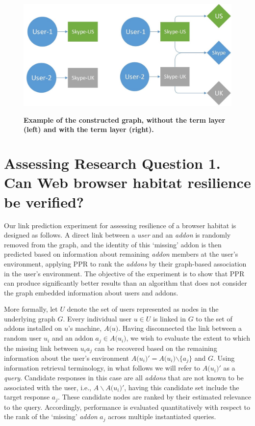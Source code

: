 \documentclass[10pt,letterpaper]{article}
\begin{document}
\begin{figure}[!h]
\caption{{\bf Example of the constructed graph, without the term layer (left) and with the term layer (right).}}
\includegraphics[width=\linewidth]{figures/skype.jpg}
\label{fig:skype}
\end{figure}

\section*{Assessing Research Question 1. Can Web browser habitat resilience be verified?}

Our link prediction experiment for assessing resilience of a browser habitat is designed as follows. A direct link between a \textit{user} and an\textit{ addon} is randomly removed from the graph, and the identity of this `missing' addon is then predicted based on information about remaining \textit{addon} members at the user's environment, applying PPR to rank the \textit{addons} by their graph-based association in the user's environment. The objective of the experiment is to show that PPR can produce significantly better results than an algorithm that does not consider the graph embedded information about users and addons. 

More formally, let $U$ denote the set of users represented as nodes in the underlying graph $G$. Every individual user $u\mathrm{\in }U$ is linked in $G$ to the set of addons installed on $u$'s machine, $A\mathrm{(}u\mathrm{)}$. Having disconnected the link between a random user $u_i$ and an addon $a_j\mathrm{\in }A\mathrm{(}u_i\mathrm{)}$, we wish to evaluate the extent to which the missing link between $u_ia_j$ can be recovered based on the remaining information about the user's environment $A\mathrm{(}u_i\mathrm{)'=}A\mathrm{(}u_i\mathrm{)}\mathrm{\backslash }\mathrm{\{}a_j\}$ and $G$. Using information retrieval terminology, in what follows we will refer to $A\mathrm{(}u_i\mathrm{)'}$ as a \textit{query}. Candidate responses in this case are all\textit{ addons} that are not known to be associated with the user, i.e., $A\backslash A\mathrm{(}u_i\mathrm{)'}$, having this candidate set include the target response $a_j$. These candidate nodes are ranked by their estimated relevance to the query. Accordingly, performance is evaluated quantitatively with respect to the rank of the `missing'\textit{ addon} $a_j$ across multiple instantiated queries.
\end{document}
